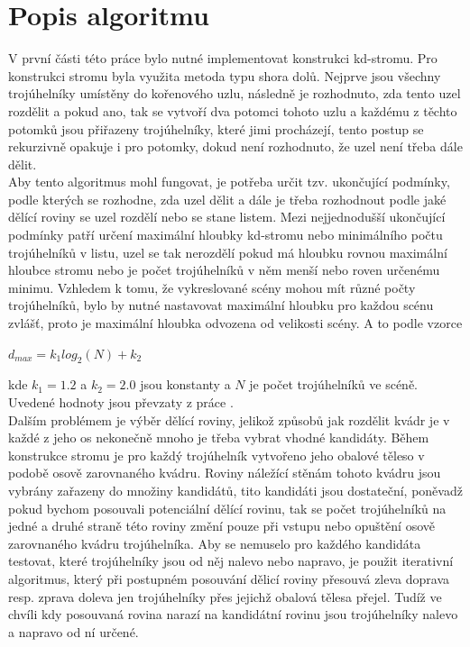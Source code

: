 \documentclass[report,11pt]{elsarticle}
\begin{document}
\section{\label{SEC:Description}Popis algoritmu}

V první části této práce bylo nutné implementovat konstrukci kd-stromu. Pro konstrukci stromu byla využita metoda typu shora dolů. Nejprve jsou všechny trojúhelníky umístěny do kořenového uzlu, následně je rozhodnuto, zda tento uzel rozdělit a pokud ano, tak se vytvoří dva potomci tohoto uzlu a každému z těchto potomků jsou přiřazeny trojúhelníky, které jimi procházejí, tento postup se rekurzivně opakuje i pro potomky, dokud není rozhodnuto, že uzel není třeba dále dělit. \\

Aby tento algoritmus mohl fungovat, je potřeba určit tzv. ukončující podmínky, podle kterých se rozhodne, zda uzel dělit a dále je třeba rozhodnout podle jaké dělící roviny se uzel rozdělí nebo se stane listem. Mezi nejjednodušší ukončující podmínky patří určení maximální hloubky kd-stromu nebo minimálního počtu trojúhelníků v listu, uzel se tak nerozdělí pokud má hloubku rovnou maximální hloubce stromu nebo je počet trojúhelníků v něm menší nebo roven určenému minimu. Vzhledem k tomu, že vykreslované scény mohou mít různé počty trojúhelníků, bylo by nutné nastavovat maximální hloubku pro každou scénu zvlášť, proto je maximální hloubka odvozena od velikosti scény. A to podle vzorce\\
\begin{center}
$d_{max}=k_1log_2(N)+k_2$
\end{center}
kde $k_1=1.2$ a $k_2=2.0$ jsou konstanty a $N$ je počet trojúhelníků ve scéně. Uvedené hodnoty jsou převzaty z práce \cite{BittnerHavran}.\\

Dalším problémem je výběr dělící roviny, jelikož způsobů jak rozdělit kvádr je v každé z jeho os nekonečně mnoho je třeba vybrat vhodné kandidáty. Během konstrukce stromu je pro každý trojúhelník vytvořeno jeho obalové těleso v podobě osově zarovnaného kvádru. Roviny náležící stěnám tohoto kvádru jsou vybrány zařazeny do množiny kandidátů, tito kandidáti jsou dostateční, poněvadž pokud bychom posouvali potenciální dělící rovinu, tak se počet trojúhelníků na jedné a druhé straně této roviny změní pouze při vstupu nebo opuštění osově zarovnaného kvádru trojúhelníka. Aby se nemuselo pro každého kandidáta   testovat, které trojúhelníky jsou od něj nalevo nebo napravo, je použit iterativní algoritmus, který při postupném posouvání dělicí roviny přesouvá zleva doprava resp. zprava doleva jen trojúhelníky přes jejichž obalová tělesa přejel. Tudíž ve chvíli kdy posouvaná rovina narazí na kandidátní rovinu jsou trojúhelníky nalevo a napravo od ní určené.\cite{WaldHavran}\\
\end{document}
